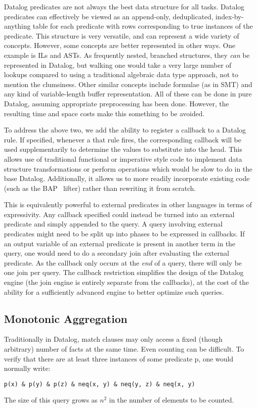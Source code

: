 Datalog predicates are not always the best data structure for all tasks.
Datalog predicates can effectively be viewed as an append-only, deduplicated, index-by-anything table for each predicate with rows corresponding to true instances of the predicate.
This structure is very versatile, and can represent a wide variety of concepts.
However, some concepts are better represented in other ways.
One example is ILs and ASTs.
As frequently nested, branched structures, they \emph{can} be represented in Datalog, but walking one would take a very large number of lookups compared to using a traditional algebraic data type approach, not to mention the clumsiness.
Other similar concepts include formulae (as in SMT) and any kind of variable-length buffer representation.
All of these can be done in pure Datalog, assuming appropriate preprocessing has been done.
However, the resulting time and space costs make this something to be avoided.

To address the above two, we add the ability to register a callback to a Datalog rule.
If specified, whenever a that rule fires, the corresponding callback will be used supplementarily to determine the values to substitute into the head.
This allows use of traditional functional or imperative style code to implement data structure transformations or perform operations which would be slow to do in the base Datalog.
Additionally, it allows us to more readily incorporate existing code (such as the BAP~\cite{bap} lifter) rather than rewriting it from scratch.

This is equivalently powerful to external predicates in other languages in terms of expressivity.
Any callback specified could instead be turned into an external predicate and simply appended to the query.
A query involving external predicates might need to be split up into phases to be expressed in callbacks.
If an output variable of an external predicate is present in another term in the query, one would need to do a secondary join after evaluating the external predicate.
As the callback only occurs at the \emph{end} of a query, there will only be one join per query.
The callback restriction simplifies the design of the Datalog engine (the join engine is entirely separate from the callbacks), at the cost of the ability for a sufficiently advanced engine to better optimize such queries.

\subsection{Monotonic Aggregation}
Traditionally in Datalog, match clauses may only access a fixed (though arbitrary) number of facts at the same time.
Even counting can be difficult.
To verify that there are at least three instances of some predicate p, one would normally write:
\begin{verbatim}
p(x) & p(y) & p(z) & neq(x, y) & neq(y, z) & neq(x, y)
\end{verbatim}
The size of this query grows as $n^2$ in the number of elements to be counted.

